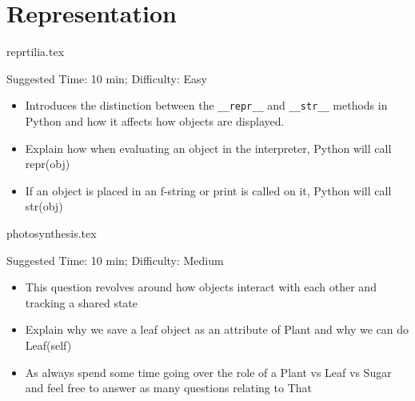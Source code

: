 \documentclass{exam}
\begin{document}
\section{Representation}
\begin{questions}
    {reprtilia.tex}
    \begin{questionmeta}
        Suggested Time: 10 min; Difficulty: Easy
        \begin{itemize}
            \item  Introduces the distinction between the \lstinline{__repr__} and \lstinline{__str__} methods in Python and how it affects how objects are displayed. 
            \item Explain how when evaluating an object in the interpreter, Python will call repr(obj)
            \item If an object is placed in an f-string or print is called on it, Python will call str(obj)
        \end{itemize}
      \end{questionmeta}  
      
    {photosynthesis.tex}
    \begin{questionmeta}
        Suggested Time: 10 min; Difficulty: Medium
        \begin{itemize}
            \item This question revolves around how objects interact with each other and tracking a shared state
            \item Explain why we save a leaf object as an attribute of Plant and why we can do Leaf(self)
            \item As always spend some time going over the role of a Plant vs Leaf vs Sugar and feel free to answer as many questions relating to That
        \end{itemize}
      \end{questionmeta} 
\end{questions}
\end{document}
